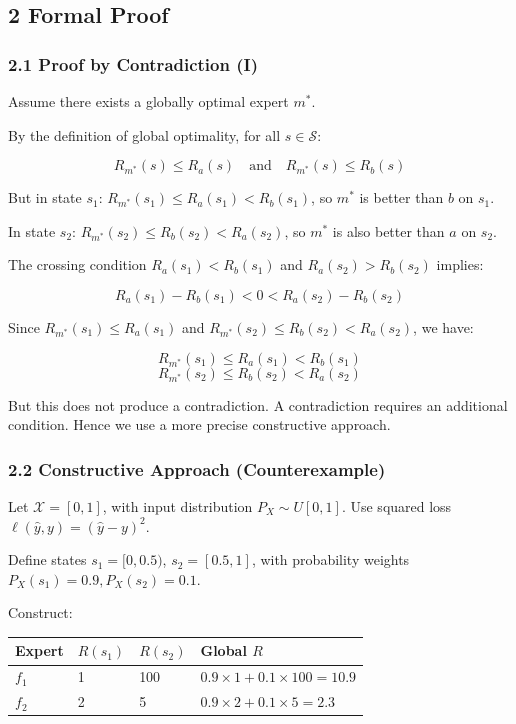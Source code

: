 \documentclass[
  12pt,
]{ctexart}
\begin{document}
\subsection{2 Formal Proof}\label{formal-proof}

\subsubsection{2.1 Proof by Contradiction (I)}\label{proof-by-contradiction-i}

Assume there exists a globally optimal expert \(m^*\).

By the definition of global optimality, for all \(s \in \mathcal{S}\):

\[R_{m^*}(s) \leq R_a(s) \quad \text{and} \quad R_{m^*}(s) \leq R_b(s)\]

But in state \(s_1\): \(R_{m^*}(s_1) \leq R_a(s_1) < R_b(s_1)\), so
\(m^*\) is better than \(b\) on \(s_1\).

In state \(s_2\): \(R_{m^*}(s_2) \leq R_b(s_2) < R_a(s_2)\), so \(m^*\)
is also better than \(a\) on \(s_2\).

The crossing condition \(R_a(s_1) < R_b(s_1)\) and \(R_a(s_2) > R_b(s_2)\) implies:

\[R_a(s_1) - R_b(s_1) < 0 < R_a(s_2) - R_b(s_2)\]

Since \(R_{m^*}(s_1) \leq R_a(s_1)\) and \(R_{m^*}(s_2) \leq R_b(s_2) < R_a(s_2)\), we have:

\[R_{m^*}(s_1) \leq R_a(s_1) < R_b(s_1)\]
\[R_{m^*}(s_2) \leq R_b(s_2) < R_a(s_2)\]

But this does not produce a contradiction. A contradiction requires an additional condition. Hence we use a more precise constructive approach.

\subsubsection{2.2 Constructive Approach (Counterexample)}\label{constructive-approach-counterexample}

Let \(\mathcal{X} = [0, 1]\), with input distribution \(P_X \sim U[0, 1]\). Use squared loss
\(\ell(\hat{y}, y) = (\hat{y} - y)^2\).

Define states \(s_1 = [0, 0.5)\), \(s_2 = [0.5, 1]\), with probability weights
\(P_X(s_1) = 0.9, P_X(s_2) = 0.1\).

Construct:

\begin{longtable}[]{@{}llll@{}}
\toprule\noalign{}
Expert & \(R(s_1)\) & \(R(s_2)\) & Global \(R\) \\
\midrule\noalign{}
\endhead
\bottomrule\noalign{}
\endlastfoot
\(f_1\) & 1 & 100 & \(0.9 \times 1 + 0.1 \times 100 = 10.9\) \\
\(f_2\) & 2 & 5 & \(0.9 \times 2 + 0.1 \times 5 = 2.3\) \\
\end{longtable}
\end{document}
